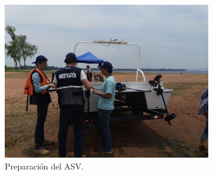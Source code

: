 \begin{figure}[h]
     \centering
     \begin{subfigure}[b]{0.65\textwidth}
         \centering
         \includegraphics[width=\textwidth]{Imagenes/cap4/PruebaCampo.jpeg}
         \caption{Preparaci\'on del ASV.}
         \label{fig:PreparacionASV}
     \end{subfigure}
     \hfill
     \begin{subfigure}[b]{0.3\textwidth}
         \centering

\end{subfigure}
\end{figure}

